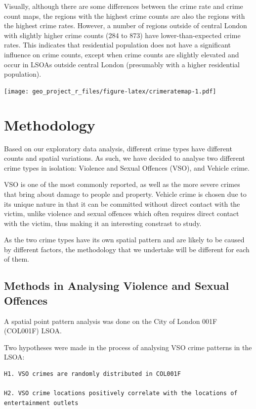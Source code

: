\documentclass[]{article}
\begin{document}
Visually, although there are some differences between the crime rate and
crime count maps, the regions with the highest crime counts are also the
regions with the highest crime rates. However, a number of regions
outside of central London with slightly higher crime counts (284 to 873)
have lower-than-expected crime rates. This indicates that residential
population does not have a significant influence on crime counts, except
when crime counts are slightly elevated and occur in LSOAs outside
central London (presumably with a higher residential population).

\texttt{[image: geo\_project\_r\_files/figure-latex/crimeratemap-1.pdf]}
\pagebreak

\section{Methodology}\label{methodology}

Based on our exploratory data analysis, different crime types have
different counts and spatial variations. As such, we have decided to
analyse two different crime types in isolation: Violence and Sexual
Offences (VSO), and Vehicle crime.

VSO is one of the most commonly reported, as well as the more severe
crimes that bring about damage to people and property. Vehicle crime is
chosen due to its unique nature in that it can be committed without
direct contact with the victim, unlike violence and sexual offences
which often requires direct contact with the victim, thus making it an
interesting constrast to study.

As the two crime types have its own spatial pattern and are likely to be
caused by different factors, the methodology that we undertake will be
different for each of them.

\subsection{Methods in Analysing Violence and Sexual
Offences}\label{methods-in-analysing-violence-and-sexual-offences}

A spatial point pattern analysis was done on the City of London 001F
(COL001F) LSOA.

Two hypotheses were made in the process of analysing VSO crime patterns
in the LSOA:

\begin{verbatim}
H1. VSO crimes are randomly distributed in COL001F 

H2. VSO crime locations positively correlate with the locations of entertainment outlets
\end{verbatim}
\end{document}
